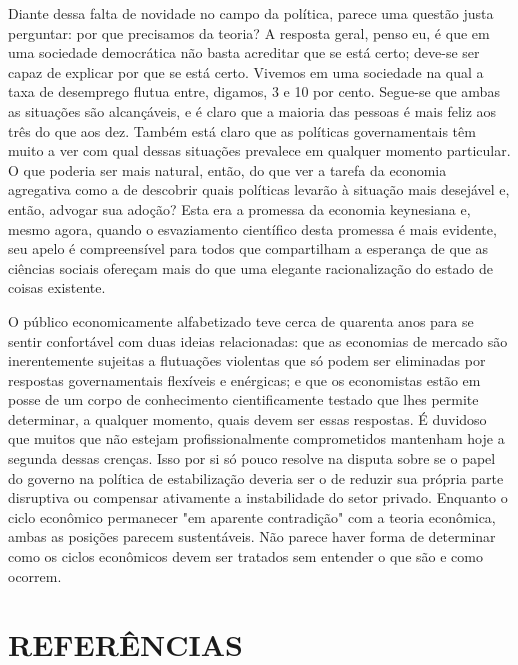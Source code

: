 \documentclass[12pt]{article}
\begin{document}
Diante dessa falta de novidade no campo da política, parece uma questão justa perguntar: por que precisamos da teoria? A resposta geral, penso eu, é que em uma sociedade democrática não basta acreditar que se está certo; deve-se ser capaz de explicar por que se está certo. Vivemos em uma sociedade na qual a taxa de desemprego flutua entre, digamos, 3 e 10 por cento. Segue-se que ambas as situações são alcançáveis, e é claro que a maioria das pessoas é mais feliz aos três do que aos dez. Também está claro que as políticas governamentais têm muito a ver com qual dessas situações prevalece em qualquer momento particular. O que poderia ser mais natural, então, do que ver a tarefa da economia agregativa como a de descobrir quais políticas levarão à situação mais desejável e, então, advogar sua adoção? Esta era a promessa da economia keynesiana e, mesmo agora, quando o esvaziamento científico desta promessa é mais evidente, seu apelo é compreensível para todos que compartilham a esperança de que as ciências sociais ofereçam mais do que uma elegante racionalização do estado de coisas existente.

O público economicamente alfabetizado teve cerca de quarenta anos para se sentir confortável com duas ideias relacionadas: que as economias de mercado são inerentemente sujeitas a flutuações violentas que só podem ser eliminadas por respostas governamentais flexíveis e enérgicas; e que os economistas estão em posse de um corpo de conhecimento cientificamente testado que lhes permite determinar, a qualquer momento, quais devem ser essas respostas. É duvidoso que muitos que não estejam profissionalmente comprometidos mantenham hoje a segunda dessas crenças. Isso por si só pouco resolve na disputa sobre se o papel do governo na política de estabilização deveria ser o de reduzir sua própria parte disruptiva ou compensar ativamente a instabilidade do setor privado. Enquanto o ciclo econômico permanecer "em aparente contradição" com a teoria econômica, ambas as posições parecem sustentáveis. Não parece haver forma de determinar como os ciclos econômicos devem ser tratados sem entender o que são e como ocorrem.

\section*{REFERÊNCIAS}
\end{document}
